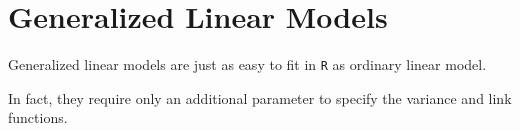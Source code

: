 \documentclass[residuals.tex]{subfiles}
\begin{document}
	

\section{Generalized Linear Models}

Generalized linear models are just as easy to fit in \texttt{R} as ordinary linear model. 

In fact, they require only an additional parameter to specify the variance and link functions.
 
 

\end{document}
